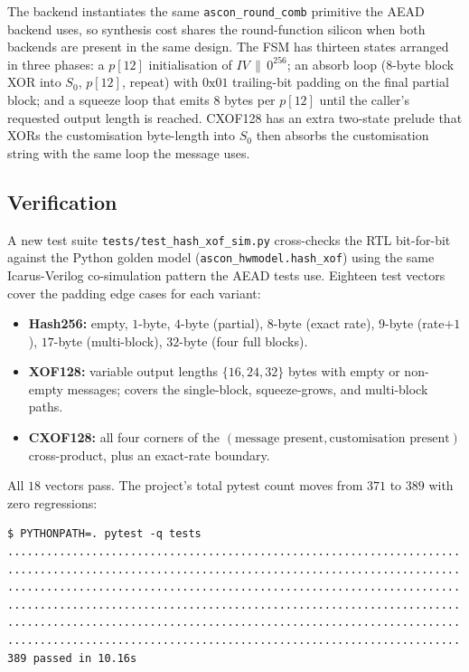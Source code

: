 \documentclass[11pt,a4paper]{article}
\begin{document}
The backend instantiates the same \texttt{ascon\_round\_comb} primitive
the AEAD backend uses, so synthesis cost shares the round-function
silicon when both backends are present in the same design. The FSM
has thirteen states arranged in three phases: a $p[12]$ initialisation
of $IV \,\|\, 0^{256}$; an absorb loop ($8$-byte block XOR into $S_0$,
$p[12]$, repeat) with $0\text{x}01$ trailing-bit padding on the final
partial block; and a squeeze loop that emits $8$ bytes per $p[12]$
until the caller's requested output length is reached. CXOF128 has
an extra two-state prelude that XORs the customisation byte-length
into $S_0$ then absorbs the customisation string with the same loop
the message uses.

\subsection{Verification}

A new test suite \texttt{tests/test\_hash\_xof\_sim.py} cross-checks
the RTL bit-for-bit against the Python golden model
(\texttt{ascon\_hwmodel.hash\_xof}) using the same Icarus-Verilog
co-simulation pattern the AEAD tests use. Eighteen test vectors
cover the padding edge cases for each variant:

\begin{itemize}[noitemsep]
  \item \textbf{Hash256:} empty, $1$-byte, $4$-byte (partial),
        $8$-byte (exact rate), $9$-byte (rate$+1$), $17$-byte
        (multi-block), $32$-byte (four full blocks).
  \item \textbf{XOF128:} variable output lengths $\{16, 24, 32\}$
        bytes with empty or non-empty messages; covers the
        single-block, squeeze-grows, and multi-block paths.
  \item \textbf{CXOF128:} all four corners of the
        $(\text{message present},\text{customisation present})$
        cross-product, plus an exact-rate boundary.
\end{itemize}

All $18$ vectors pass. The project's total pytest count moves from
$371$ to $389$ with zero regressions:

\begin{lstlisting}[language=shell]
$ PYTHONPATH=. pytest -q tests
......................................................................
......................................................................
......................................................................
......................................................................
......................................................................
......................................................................
389 passed in 10.16s
\end{lstlisting}
\end{document}

